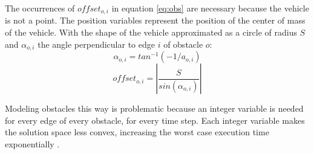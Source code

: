 The occurrences of $offset_{o,i}$ in equation \ref{eq:obs} are necessary because the vehicle is not a point. The position variables represent the position of the center of mass of the vehicle. With the shape of the vehicle approximated as a circle of radius $S$ and $\alpha_{o,i}$ the angle perpendicular to edge $i$ of obstacle $o$:
\begin{equation}
\alpha_{o,i} = tan^{-1}( -1 / a_{o,i})
\end{equation}
\begin{equation}
offset_{o,i} = |\dfrac{S}{sin(\alpha_{o,i})}|
\end{equation}

Modeling obstacles this way is problematic because an integer variable is needed for every edge of every obstacle, for every time step. Each integer variable makes the solution space less convex, increasing the worst case execution time exponentially \cite{DBLP:conf/coco/Karp72}.